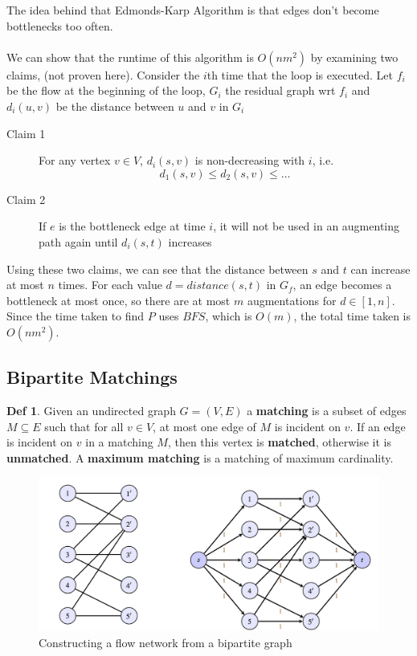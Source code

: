 \documentclass{article}
\theoremstyle{plain}
\theoremstyle{definition}
\newtheorem{defn}[dummy]{Def}
\begin{document}
        The idea behind that Edmonds-Karp Algorithm is that edges don't become bottlenecks too often. \\ \\
        We can show that the runtime of this algorithm is $O(nm^2)$ by examining two claims, (not proven here). Consider the $i$th time that the loop is executed. Let $f_i$ be the flow at the beginning of the loop, $G_i$ the residual graph wrt $f_i$ and $d_i(u,v)$ be the distance between $u$ and $v$ in $G_i$ 
        \begin{description}
            \item[Claim 1] For any vertex $v \in V$, $d_i(s,v)$ is non-decreasing with $i$, i.e.
            \[ d_1(s,v) \leq d_2(s,v) \leq \ldots \]
            \item[Claim 2] If $e$ is the bottleneck edge at time $i$, it will not be used in an augmenting path again until $d_i(s,t)$ increases
        \end{description}
        Using these two claims, we can see that the distance between $s$ and $t$ can increase at most $n$ times. For each value $d = distance(s,t)$ in $G_f$, an edge becomes a bottleneck at most once, so there are at most $m$ augmentations for $d \in [1, n]$. Since the time taken to find $P$ uses $BFS$, which is $O(m)$, the total time taken is $O(nm^2)$. 
        
    \subsection{Bipartite Matchings}
        \begin{defn}
            Given an undirected graph $G=(V,E)$ a \textbf{matching} is a subset of edges $M \subseteq E$ such that for all $v \in V$, at most one edge of $M$ is incident on $v$. If an edge is incident on $v$ in a matching $M$, then this vertex is \textbf{matched}, otherwise it is \textbf{unmatched}. A \textbf{maximum matching} is a matching of maximum cardinality. 
        \end{defn}

        \begin{figure}
            \centering
            \includegraphics[width=\linewidth]{images/bipartite.png}
            \caption{Constructing a flow network from a bipartite graph}
            \label{fig:bipartite}
        \end{figure}
\end{document}
